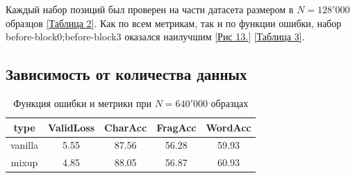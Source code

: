Каждый набор позиций был проверен на части датасета размером в $N = 128'000$ образцов \hyperref[tab:mixup_position]{[Таблица 2]}. Как по всем метрикам, так и по функции ошибки, набор before-block0;before-block3 оказался наилучшим \hyperlink{image13}{[Рис 13.]} \hyperref[tab:mixup_position_metrics]{[Таблица 3]}.

\newpage
\subsection{Зависимость от количества данных}

\begin{table}[]
\centering
\begin{tabular}{||c c c c c||} 
 \hline
 type & ValidLoss & CharAcc & FragAcc & WordAcc \\ [0.5ex] 
 \hline\hline
 vanilla & 5.55 & 87.56 & 56.28 & 59.93\\ 
 \hline
 mixup & 4.85 & 88.05 & 56.87 & 60.93\\ [1ex] 
 \hline
\end{tabular}
\caption{Функция ошибки и метрики при $N = 640'000$ образцах}
\end{table}

\newpage
